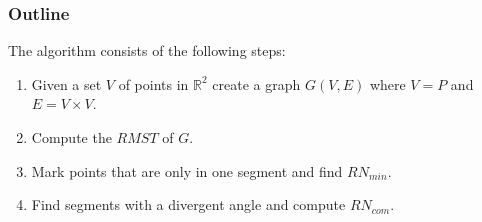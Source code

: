 \documentclass[11pt]{article}
\begin{document}
\subsubsection{Outline}

The algorithm consists of the following steps:
\begin{enumerate}
  \item Given a set $V$ of points in $\mathbb{R}^2$ create a graph $G(V,E)$ where $V=P$ and $E=V\times V$.
  \item Compute the $RMST$ of $G$.
  \item Mark points that are only in one segment and find $RN_{min}$.
  \item Find segments with a divergent angle and compute $RN_{com}$.
  \end{enumerate}
  
\end{document}
